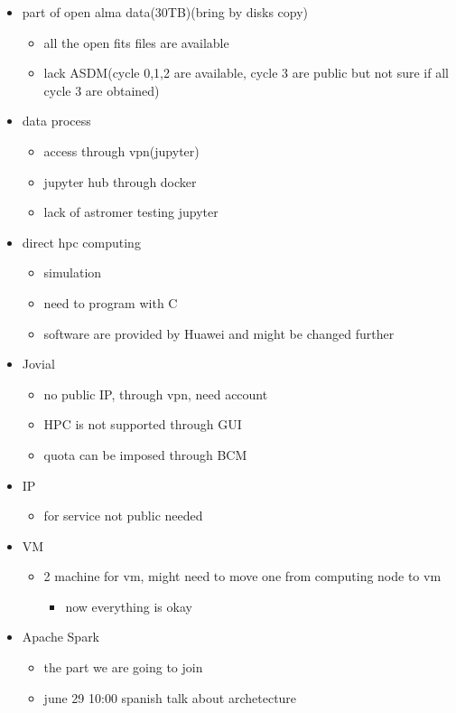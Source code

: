 \documentclass[11pt]{article}
\begin{document}
\begin{itemize}
\item part of open alma data(30TB)(bring by disks copy)
\begin{itemize}
\item all the open fits files are available
\item lack ASDM(cycle 0,1,2 are available, cycle 3 are public but not sure if all cycle 3 are obtained)
\end{itemize}
\item data process
\begin{itemize}
\item access through vpn(jupyter)
\item jupyter hub through docker
\item lack of astromer testing jupyter
\end{itemize}
\item direct hpc computing
\begin{itemize}
\item simulation
\item need to program with C
\item software are provided by Huawei and might be changed further
\end{itemize}
\item Jovial
\begin{itemize}
\item no public IP, through vpn, need account
\item HPC is not supported through GUI
\item quota can be imposed through BCM
\end{itemize}
\item IP
\begin{itemize}
\item for service not public needed
\end{itemize}
\item VM
\begin{itemize}
\item 2 machine for vm, might need to move one from computing node to vm
\begin{itemize}
\item now everything is okay
\end{itemize}
\end{itemize}
\item Apache Spark
\begin{itemize}
\item the part we are going to join
\item june 29 10:00 spanish talk about archetecture

\end{itemize}
\end{itemize}
\end{document}
